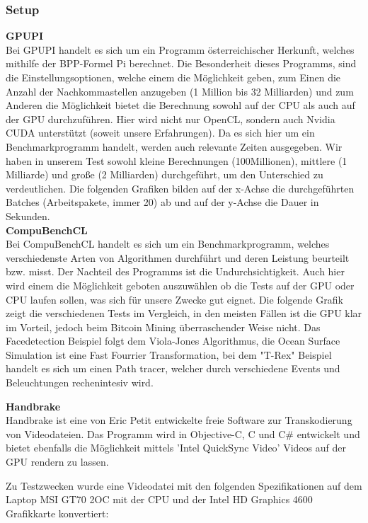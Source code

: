 \subsubsection{Setup}
\textbf{GPUPI}\\
Bei GPUPI handelt es sich um ein Programm österreichischer Herkunft, welches mithilfe der BPP-Formel Pi berechnet. Die Besonderheit dieses Programms, sind die Einstellungsoptionen, welche einem die Möglichkeit geben, zum Einen die Anzahl der Nachkommastellen anzugeben (1 Million bis 32 Milliarden) und zum Anderen die Möglichkeit bietet die Berechnung sowohl auf der CPU als auch auf der GPU durchzuführen. Hier wird nicht nur OpenCL, sondern auch Nvidia CUDA unterstützt (soweit unsere Erfahrungen). Da es sich hier um ein Benchmarkprogramm handelt, werden auch relevante Zeiten ausgegeben. Wir haben in unserem Test sowohl kleine Berechnungen (100Millionen), mittlere (1 Milliarde) und große (2 Milliarden) durchgeführt, um den Unterschied zu verdeutlichen.
Die folgenden Grafiken bilden auf der x-Achse die durchgeführten Batches (Arbeitspakete, immer 20) ab und auf der y-Achse die Dauer in Sekunden.\cite{gpupi}\\[0.3cm]
\textbf{CompuBenchCL}\\
Bei CompuBenchCL handelt es sich um ein Benchmarkprogramm, welches verschiedenste Arten von Algorithmen durchführt und deren Leistung beurteilt bzw. misst. Der Nachteil des Programms ist die Undurchsichtigkeit.
Auch hier wird einem die Möglichkeit geboten auszuwählen ob die Tests auf der GPU oder CPU laufen sollen, was sich für unsere Zwecke gut eignet. 
Die folgende Grafik zeigt die verschiedenen Tests im Vergleich, in den meisten Fällen ist die GPU klar im Vorteil, jedoch beim Bitcoin Mining überraschender Weise nicht.
Das Facedetection Beispiel folgt dem Viola-Jones Algorithmus, die Ocean Surface Simulation ist eine Fast Fourrier Transformation, bei dem "T-Rex" Beispiel handelt es sich um einen Path tracer, welcher durch verschiedene Events und Beleuchtungen rechenintesiv wird. \cite{compubench}

\textbf{Handbrake}\\
Handbrake ist eine von Eric Petit entwickelte freie Software zur Transkodierung von Videodateien. Das Programm wird in Objective-C, C und C\# entwickelt und bietet ebenfalls die Möglichkeit mittels 'Intel QuickSync Video' Videos auf der GPU rendern zu lassen.
\cite{Handbrake}

Zu Testzwecken wurde eine Videodatei mit den folgenden Spezifikationen auf dem Laptop MSI GT70 2OC mit der CPU und der Intel HD Graphics 4600 Grafikkarte konvertiert:

